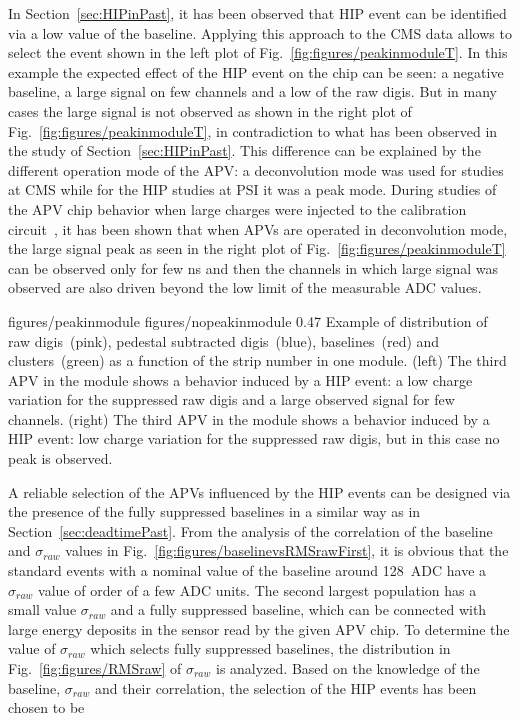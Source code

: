 In Section~\ref{sec:HIPinPast}, it has been observed that HIP event can be identified via a low value of the baseline. Applying this approach to the CMS data allows to select the event shown in the left plot of Fig.~\ref{fig:figures/peakinmoduleT}. In this example the expected effect of the HIP event on the chip can be seen: a negative baseline, a large signal on few channels and a low \SD of the raw digis. But in many cases the large signal is not observed as shown in the right plot of Fig.~\ref{fig:figures/peakinmoduleT}, in contradiction to what has been observed in the study of Section~\ref{sec:HIPinPast}. This difference can be explained by the different operation mode of the APV: a deconvolution mode was used for studies at CMS while for the HIP studies at PSI it was a peak mode. During studies of the APV chip behavior when large charges were injected to the calibration circuit~\cite{Bainbridge:2002bda}, it has been shown that when APVs are operated in deconvolution mode, the large signal peak as seen in the right plot of Fig.~\ref{fig:figures/peakinmoduleT} can be observed only for few ns and then the channels in which large signal was observed are also driven beyond the low limit of the measurable ADC values. 

                 {figures/peakinmodule} %
                 {figures/nopeakinmodule} %
                 {0.47}       %
                 {Example of distribution of raw digis~(pink), pedestal subtracted digis~(blue), baselines~(red) and clusters~(green) as a function of the strip number in one module. (left) The third APV in the module shows a behavior induced by a HIP event: a low charge variation for the suppressed raw digis and a large observed signal for few channels. (right)  The third APV in the module shows a behavior induced by a HIP event: low charge variation for the suppressed raw digis, but in this case no peak is observed. } %

A reliable selection of the APVs influenced by the HIP events can be designed via the presence of the fully suppressed baselines in a similar way as in Section~\ref{sec:deadtimePast}. From the analysis of the correlation of the baseline and $\sigma_{raw}$ values in Fig.~\ref{fig:figures/baselinevsRMSrawFirst}, it is obvious that the standard events with a nominal value of the baseline around 128~ADC have a $\sigma_{raw}$ value of order of a few ADC units.  The second largest population has a small value $\sigma_{raw}$ and a fully suppressed baseline, which can be connected with large energy deposits in the sensor read by the given APV chip. To determine the value of $\sigma_{raw}$ which selects fully suppressed baselines, the distribution in Fig.~\ref{fig:figures/RMSraw} of $\sigma_{raw}$ is analyzed. Based on the knowledge of the baseline, $\sigma_{raw}$ and their correlation, the selection of the HIP events has been chosen to be 

